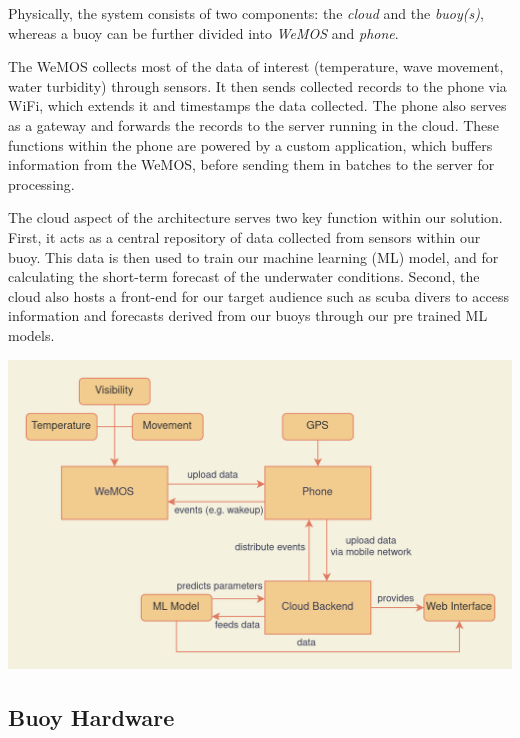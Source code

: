 \documentclass{article}
\begin{document}
\begin{multicols}{2}

Physically, the system consists of two components: the \textit{cloud} and the \textit{buoy(s)}, whereas a buoy can be further divided into \textit{WeMOS} and \textit{phone}. 

The WeMOS collects most of the data of interest (temperature, wave movement, water turbidity) through sensors. It then sends collected records to the phone via WiFi, which extends it and timestamps the data collected. The phone also serves as a gateway and forwards the records to the server running in the cloud. These functions within the phone are powered by a custom application, which buffers information from the WeMOS, before sending them in batches to the server for processing.

The cloud aspect of the architecture serves two key function within our solution. First, it acts as a central repository of data collected from sensors within our buoy. This data is then used to train our machine learning (ML) model, and for calculating the short-term forecast of the underwater conditions. Second, the cloud also hosts a front-end for our target audience such as scuba divers to access information and forecasts derived from our buoys through our pre trained ML models.

\includegraphics[width=\columnwidth]{report/resources/architecture.png}

\end{multicols}

\subsection{Buoy Hardware}
\end{document}
